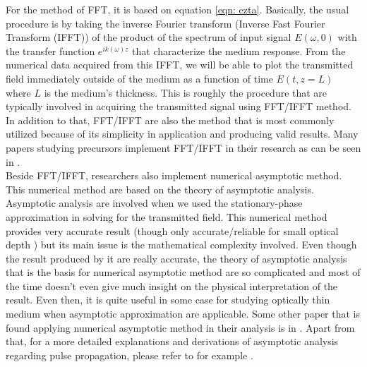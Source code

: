 For the method of FFT, it is based on equation \ref{eqn: ezta}. Basically, the usual procedure is by taking the inverse Fourier transform (Inverse Fast Fourier Transform (IFFT)) of the product of the spectrum of input signal $E(\omega, 0)$ with the transfer function $e^{i k(\omega) z}$ that characterize the medium response. From the numerical data acquired from this IFFT, we will be able to plot the transmitted field immediately outside of the medium as a function of time $E(t, z = L)$ where $L$ is the medium's thickness. This is roughly the procedure that are typically involved in acquiring the transmitted signal using FFT/IFFT method. In addition to that, FFT/IFFT are also the method that is most commonly utilized because of its simplicity in application and producing valid results. Many papers studying precursors implement FFT/IFFT in their research as can be seen in \cite{Chen2010, Macke2013, MacKe2009, Oughstun2010, Wei2009, Jeong2008, Jeong2010}.\\

Beside FFT/IFFT, researchers also implement numerical asymptotic method. This numerical method are based on the theory of asymptotic analysis. Asymptotic analysis are involved when we used the stationary-phase approximation in solving for the transmitted field. This numerical method provides very accurate result (though only accurate/reliable for small optical depth \cite{Jeong2011}) but its main issue is the mathematical complexity involved. Even though the result produced by it are really accurate, the theory of asymptotic analysis that is the basis for numerical asymptotic method are so complicated and most of the time doesn't even give much insight on the physical interpretation of the result. Even then, it is quite useful in some case for studying optically thin medium when asymptotic approximation are applicable. Some other paper that is found applying numerical asymptotic method in their analysis is in \cite{Jeong2009}. Apart from that, for a more detailed explanations and derivations of asymptotic analysis regarding pulse propagation, please refer to for example \cite{Oughstun2019}.

